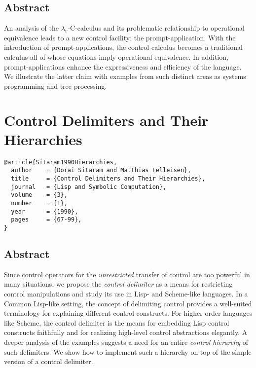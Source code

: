 \documentclass[letterpaper]{llncs}
\begin{document}
\subsection*{Abstract}
An analysis of the $\lambda_v$-C-calculus and its problematic relationship to operational equivalence leads to a new control facility: the prompt-application. With the introduction of prompt-applications, the control calculus becomes a traditional calculus all of whose equations imply operational equivalence. In addition, prompt-applications enhance the expressiveness and efficiency of the language. We illustrate the latter claim with examples from such distinct areas as systems programming and tree processing.






\section*{Control Delimiters and Their Hierarchies}%

\begin{verbatim}
@article{Sitaram1990Hierarchies,
  author    = {Dorai Sitaram and Matthias Felleisen},
  title     = {Control Delimiters and Their Hierarchies},
  journal   = {Lisp and Symbolic Computation},
  volume    = {3},
  number    = {1},
  year      = {1990},
  pages     = {67-99},
}
\end{verbatim}

\subsection*{Abstract}
Since control operators for the \textit{unrestricted} transfer of control are too powerful in many situations, we propose the \textit{control delimiter} as a means for restricting control manipulations and study its use in Lisp- and Scheme-like languages. In a Common Lisp-like setting, the concept of delimiting control provides a well-suited terminology for explaining different control constructs. For higher-order languages like Scheme, the control delimiter is the means for embedding Lisp control constructs faithfully and for realizing high-level control abstractions elegantly. A deeper analysis of the examples suggests a need for an entire \textit{control hierarchy} of such delimiters. We show how to implement such a hierarchy on top of the simple version of a control delimiter.
\end{document}

